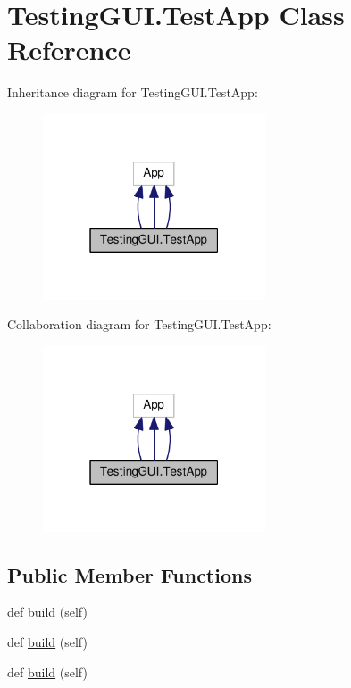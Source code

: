 \hypertarget{classTestingGUI_1_1TestApp}{}\section{Testing\+G\+U\+I.\+Test\+App Class Reference}
\label{classTestingGUI_1_1TestApp}


Inheritance diagram for Testing\+G\+U\+I.\+Test\+App\+:
\nopagebreak
\begin{figure}[H]
\begin{center}
\leavevmode
\includegraphics[width=187pt]{classTestingGUI_1_1TestApp__inherit__graph}
\end{center}
\end{figure}


Collaboration diagram for Testing\+G\+U\+I.\+Test\+App\+:
\nopagebreak
\begin{figure}[H]
\begin{center}
\leavevmode
\includegraphics[width=187pt]{classTestingGUI_1_1TestApp__coll__graph}
\end{center}
\end{figure}
\subsection*{Public Member Functions}
\begin{DoxyCompactItemize}
\item 
def \hyperlink{classTestingGUI_1_1TestApp_ae400da04ab73e37a37943e36a1a90fd7}{build} (self)
\item 
def \hyperlink{classTestingGUI_1_1TestApp_ae400da04ab73e37a37943e36a1a90fd7}{build} (self)
\item 
def \hyperlink{classTestingGUI_1_1TestApp_ae400da04ab73e37a37943e36a1a90fd7}{build} (self)
\end{DoxyCompactItemize}
